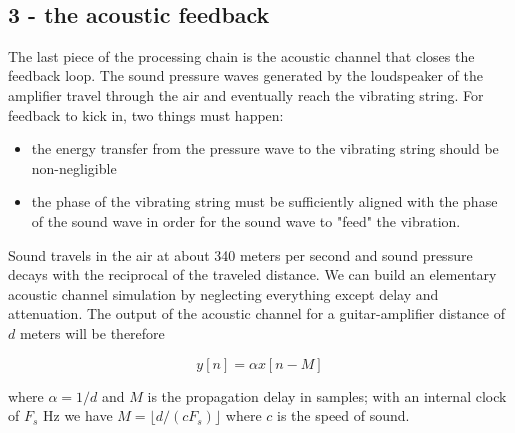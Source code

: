 \documentclass[11pt]{article}
\providecommand{\tightlist}{%
      \setlength{\itemsep}{0pt}\setlength{\parskip}{0pt}}
\begin{document}
    \begin{center}
    \end{center}
    { \hspace*{\fill} \\}
    
    \subsection{3 - the acoustic feedback}\label{the-acoustic-feedback}

    The last piece of the processing chain is the acoustic channel that
closes the feedback loop. The sound pressure waves generated by the
loudspeaker of the amplifier travel through the air and eventually reach
the vibrating string. For feedback to kick in, two things must happen:

\begin{itemize}
\tightlist
\item
  the energy transfer from the pressure wave to the vibrating string
  should be non-negligible
\item
  the phase of the vibrating string must be sufficiently aligned with
  the phase of the sound wave in order for the sound wave to "feed" the
  vibration.
\end{itemize}

Sound travels in the air at about 340 meters per second and sound
pressure decays with the reciprocal of the traveled distance. We can
build an elementary acoustic channel simulation by neglecting everything
except delay and attenuation. The output of the acoustic channel for a
guitar-amplifier distance of \(d\) meters will be therefore

\[
    y[n] = \alpha x[n-M]
\]

where \(\alpha = 1/d\) and \(M\) is the propagation delay in samples;
with an internal clock of \(F_s\) Hz we have
\(M = \lfloor d/(c F_s) \rfloor\) where \(c\) is the speed of sound.
\end{document}
